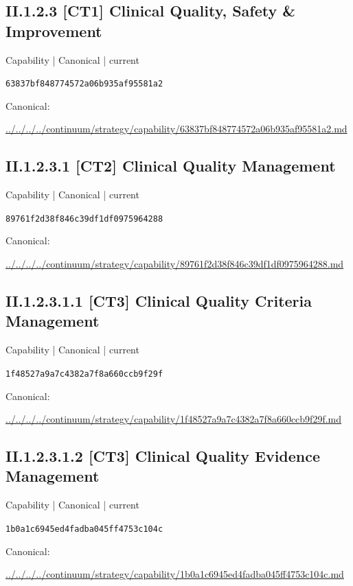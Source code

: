 \documentclass[10pt,a4paper]{article}
\begin{document}
\subsection*{II.1.2.3 [CT1] Clinical Quality, Safety \& Improvement}
{\small Capability | Canonical | current}\par
\texttt{63837bf848774572a06b935af95581a2}\par
Canonical: \par
{\footnotesize\url{../../../../continuum/strategy/capability/63837bf848774572a06b935af95581a2.md}}\par
\subsection*{II.1.2.3.1 [CT2] Clinical Quality Management}
{\small Capability | Canonical | current}\par
\texttt{89761f2d38f846c39df1df0975964288}\par
Canonical: \par
{\footnotesize\url{../../../../continuum/strategy/capability/89761f2d38f846c39df1df0975964288.md}}\par
\subsection*{II.1.2.3.1.1 [CT3] Clinical Quality Criteria Management}
{\small Capability | Canonical | current}\par
\texttt{1f48527a9a7c4382a7f8a660ccb9f29f}\par
Canonical: \par
{\footnotesize\url{../../../../continuum/strategy/capability/1f48527a9a7c4382a7f8a660ccb9f29f.md}}\par
\subsection*{II.1.2.3.1.2 [CT3] Clinical Quality Evidence Management}
{\small Capability | Canonical | current}\par
\texttt{1b0a1c6945ed4fadba045ff4753c104c}\par
Canonical: \par
{\footnotesize\url{../../../../continuum/strategy/capability/1b0a1c6945ed4fadba045ff4753c104c.md}}\par
\end{document}
